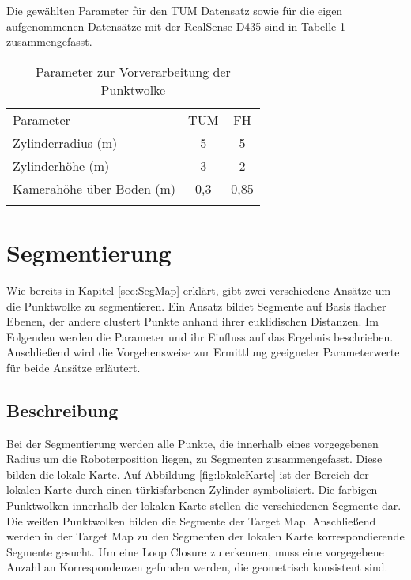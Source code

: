 Die gewählten Parameter für den TUM Datensatz sowie für die eigen auf\-ge\-nom\-men\-en Datensätze mit der RealSense D435 sind in Tabelle \ref{Vorverarbeitung} zusammengefasst. 

\renewcommand{\arraystretch}{1}
\begin {table}[H]
 \centering
 \caption{Parameter zur Vorverarbeitung der Punktwolke}
 \label{Vorverarbeitung}
 \begin{tabular}{l c c }
  \hhline{===}
   Parameter    & TUM & FH \\
  \hhline{===}
  Zylinderradius (m) &  5   &  5  \\
  \hhline{---}\noalign{\smallskip}
  Zylinderhöhe (m) &  3   &  2  \\
  \hhline{---}\noalign{\smallskip}
  Kamerahöhe über Boden (m) &  0,3  &  0,85  \\
  \hhline{===}
 \end{tabular}
\end{table}

\section[Segmentierung (Schmelzer)]{Segmentierung}
\label{sec:Segmentierung}

Wie bereits in Kapitel \ref{sec:SegMap} erklärt, gibt zwei verschiedene Ansätze um die Punktwolke zu segmentieren. Ein Ansatz bildet Segmente auf Basis flacher Ebenen, der andere clustert Punkte anhand ihrer euklidischen Distanzen. Im Folgenden werden die Parameter und ihr Einfluss auf das Ergebnis beschrieben. Anschließend wird die Vorgehensweise zur Ermittlung geeigneter Parameterwerte für beide Ansätze erläutert.

\subsection[Beschreibung (Schmelzer)]{Beschreibung}
\label{sec:Beschreibung Segmentierung}

Bei der Segmentierung werden alle Punkte, die innerhalb eines vorgegebenen Radius um die Roboterposition liegen, zu Segmenten zusammengefasst. Diese bilden die lokale Karte. Auf Abbildung \ref{fig:lokaleKarte} ist der Bereich der lokalen Karte durch einen türkisfarbenen Zylinder symbolisiert. Die farbigen Punktwolken innerhalb der lokalen Karte stellen die verschiedenen Segmente dar. Die weißen Punktwolken bilden die Segmente der Target Map. Anschließend werden in der Target Map zu den  Segmenten der lokalen Karte korrespondierende Segmente gesucht. Um eine Loop Closure zu erkennen, muss eine vorgegebene Anzahl an Korrespondenzen gefunden werden, die geometrisch konsistent sind.

